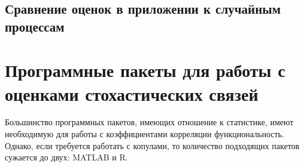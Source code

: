 


\subsection*{Сравнение оценок в приложении к случайным процессам}

\section*{Программные пакеты для работы с оценками стохастических связей}
Большинство программных пакетов, имеющих отношение к статистике, имеют необходимую для работы с коэффициентами корреляции функциональность. Однако, если требуется работать с копулами, то количество подходящих пакетов сужается до двух: MATLAB и R.

